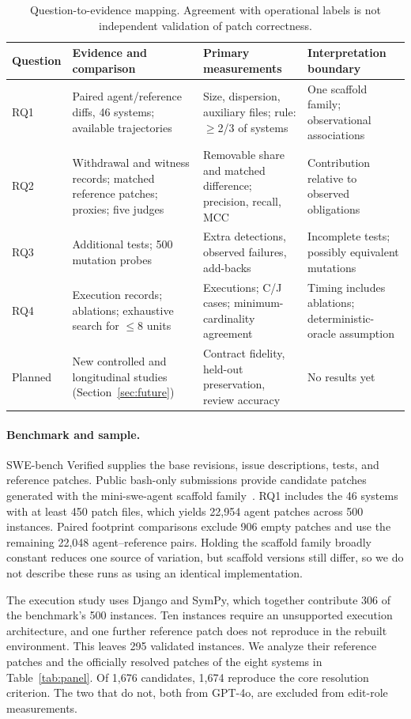 \documentclass[a4paper,fleqn]{cas-sc}
\newcommand{\lab}[1]{\textsf{#1}}
\begin{document}
\begin{table}[pos=htbp]
\caption{Question-to-evidence mapping. Agreement with operational labels is not independent validation of patch correctness.}
\label{tab:rqs}
\small\centering
\begin{tabularx}{\linewidth}{lXXX}
\toprule
Question & Evidence and comparison & Primary measurements & Interpretation boundary \\
\midrule
RQ1 & Paired agent/reference diffs, 46 systems; available trajectories & Size, dispersion, auxiliary files; rule: $\geq$2/3 of systems & One scaffold family; observational associations \\
RQ2 & Withdrawal and witness records; matched reference patches; proxies; five judges & Removable share and matched difference; precision, recall, MCC & Contribution relative to observed obligations \\
RQ3 & Additional tests; 500 mutation probes & Extra detections, observed failures, add-backs & Incomplete tests; possibly equivalent mutations \\
RQ4 & Execution records; ablations; exhaustive search for $\leq$8 units & Executions; \lab{C}/\lab{J} cases; minimum-cardinality agreement & Timing includes ablations; deterministic-oracle assumption \\
Planned & New controlled and longitudinal studies (Section~\ref{sec:future}) & Contract fidelity, held-out preservation, review accuracy & No results yet \\
\bottomrule
\end{tabularx}
\end{table}

\paragraph{Benchmark and sample.}
SWE-bench Verified supplies the base revisions, issue descriptions, tests, and reference patches. Public bash-only submissions provide candidate patches generated with the mini-swe-agent scaffold family~\citep{miniswe2025}. RQ1 includes the 46 systems with at least 450 patch files, which yields 22,954 agent patches across 500 instances. Paired footprint comparisons exclude 906 empty patches and use the remaining 22,048 agent--reference pairs. Holding the scaffold family broadly constant reduces one source of variation, but scaffold versions still differ, so we do not describe these runs as using an identical implementation.

The execution study uses Django and SymPy, which together contribute 306 of the benchmark's 500 instances. Ten instances require an unsupported execution architecture, and one further reference patch does not reproduce in the rebuilt environment. This leaves 295 validated instances. We analyze their reference patches and the officially resolved patches of the eight systems in Table~\ref{tab:panel}. Of 1,676 candidates, 1,674 reproduce the core resolution criterion. The two that do not, both from GPT-4o, are excluded from edit-role measurements.
\end{document}
